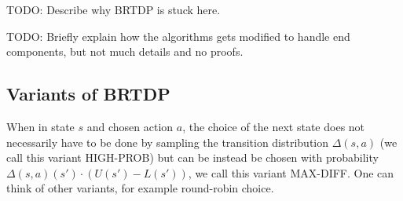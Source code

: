 \begin{example}
TODO: Describe why BRTDP is stuck here.

\begin{center}
\end{center}
\end{example}

TODO: Briefly explain how the algorithms gets modified to handle end
components, but not much details and no proofs.

\subsection*{Variants of BRTDP}
When in state $s$ and chosen action $a$,
the choice of the next state does not necessarily have to be done by
sampling the transition distribution $\Delta(s,a)$ (we call this variant
HIGH-PROB) but can be instead be chosen with probability
$\Delta(s,a)(s') \cdot (U(s') - L(s'))$, we call this variant MAX-DIFF.
One can think of other variants, for example round-robin choice.

